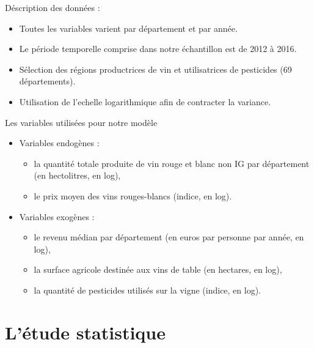 \documentclass[11pt,ignorenonframetext,]{beamer}
\providecommand{\tightlist}{%
  \setlength{\itemsep}{0pt}\setlength{\parskip}{0pt}}
\begin{document}
\begin{frame}{Déscription des données :}
\protect\hypertarget{description-des-donnees}{}

\begin{itemize}
\tightlist
\item
  Toutes les variables varient par département et par année.
\item
  Le période temporelle comprise dans notre échantillon est de 2012 à
  2016.
\item
  Sélection des régions productrices de vin et utilisatrices de
  pesticides (69 départements).
\item
  Utilisation de l'echelle logarithmique afin de contracter la variance.
\end{itemize}

\end{frame}

\begin{frame}{Les variables utilisées pour notre modèle}
\protect\hypertarget{les-variables-utilisees-pour-notre-modele}{}

\begin{itemize}
\tightlist
\item
  Variables endogènes :

  \begin{itemize}
  \tightlist
  \item
    la quantité totale produite de vin rouge et blanc non IG par
    département (en hectolitres, en log),
  \item
    le prix moyen des vins rouges-blancs (indice, en log).
  \end{itemize}
\item
  Variables exogènes :

  \begin{itemize}
  \tightlist
  \item
    le revenu médian par département (en euros par personne par année,
    en log),
  \item
    la surface agricole destinée aux vins de table (en hectares, en
    log),
  \item
    la quantité de pesticides utilisés sur la vigne (indice, en log).
  \end{itemize}
\end{itemize}

\end{frame}

\hypertarget{letude-statistique}{%
\section{L'étude statistique}\label{letude-statistique}}
\end{document}
